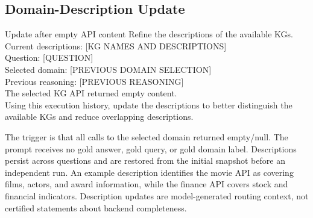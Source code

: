 \subsection{Domain-Description Update}
\begin{block}{Update after empty API content}
Refine the descriptions of the available KGs.\\
Current descriptions: [KG NAMES AND DESCRIPTIONS]\\
Question: [QUESTION]\\
Selected domain: [PREVIOUS DOMAIN SELECTION]\\
Previous reasoning: [PREVIOUS REASONING]\\
The selected KG API returned empty content.\\
Using this execution history, update the descriptions to better distinguish the available KGs and reduce overlapping descriptions.
\end{block}
The trigger is that all calls to the selected domain returned empty/null. The prompt receives no gold answer, gold query, or gold domain label. Descriptions persist across questions and are restored from the initial snapshot before an independent run. An example description identifies the movie API as covering films, actors, and award information, while the finance API covers stock and financial indicators. Description updates are model-generated routing context, not certified statements about backend completeness.

